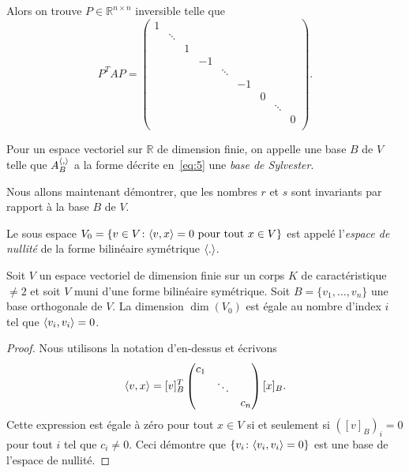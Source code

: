 Alors on trouve  $P ∈ ℝ^{n ×n}$ inversible telle que 
\begin{equation}
  \label{eq:5}
  P^T A P =
  \begin{pmatrix}
    1 &   \\
      & \ddots &  \\
      &        & 1 \\
      &        &  & -1 \\
      &        &  &    & \ddots \\
      &        &  &    &        & -1 \\
      &        &  &    &        &    & 0 \\
      &        &  &    &        &    &   & \ddots  \\
      &        &  &    &        &    &   &        & 0  \\

  \end{pmatrix}.
\end{equation}


\begin{definition}
  \label{def:37}
  Pour un espace vectoriel sur $ℝ$ de dimension finie, on appelle une base $B$ de $V$ telle que $A_B^{\langle {,} \rangle}$ a la forme décrite en~\eqref{eq:5} une \emph{base de Sylvester}. 
\end{definition}

Nous allons maintenant démontrer, que les nombres $r$ et $s$ sont invariants par rapport à la base $B$ de $V$. 


\begin{definition}
  \label{def:11}
  Le sous espace $V_0 = \{v \in V \colon \langle {v,x} \rangle = 0 \text{ pour tout } x \in V\}$ est appelé l'\emph{espace de nullité} de la forme bilinéaire symétrique $\langle {.} \rangle$. 
\end{definition}

\begin{theorem}
  \label{thr:9}
  Soit $V$
  un espace vectoriel de dimension finie sur un corps $K$
  de caractéristique $\neq 2$
  et soit $V$
  muni d'une forme bilinéaire symétrique. Soit $B = \{v_1,\dots,v_n\}$
  une base orthogonale de $V$.
  La dimension $\dim(V_0)$
  est égale au nombre d'index $i$ tel que $\langle {v_i,v_i} \rangle=0$.
\end{theorem}

\begin{proof}
  Nous utilisons la notation d'en-dessus et écrivons 
  \begin{displaymath}
    \langle {v,x} \rangle =   [v]_B^T
                    \begin{pmatrix}
                      c_1 & & \\
                                     & \ddots & \\
                                     & & c_n
                    \end{pmatrix} [x]_B. 
  \end{displaymath}
Cette expression est égale à zéro pour tout $x ∈V$  si et seulement si $\left([v]_B\right)_i = 0$ pour tout $i$ tel que $c_i \neq 0$. Ceci démontre que $\{ v_i \colon \langle {v_i,v_i} \rangle=0\}$ est une base de l'espace de nullité. 
\end{proof}



